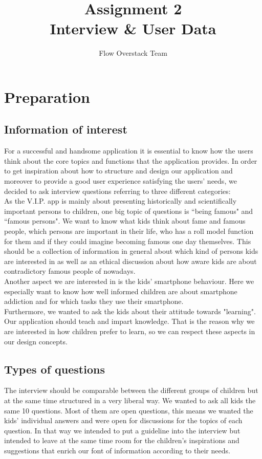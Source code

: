\documentclass[12pt]{scrartcl}
\title{Assignment 2\\ Interview \& User Data}
\author{Flow Overstack Team}
\date{}
\begin{document}
\maketitle


\section*{Preparation}
	\subsection*{Information of interest}
		For a successful and handsome application it is essential to know how the users think about the core topics and functions that the application provides. In order to get inspiration about how to structure and design our application and moreover to provide a good user experience satisfying the users' needs, we decided to ask interview questions referring to three different categories:\\
		
		As the V.I.P. app is mainly about presenting historically and scientifically important persons to children, one big topic of questions is ``being famous" and ``famous persons". We want to know what kids think about fame and famous people, which persons are important in their life, who has a roll model function for them and if they could imagine becoming famous one day themselves. This should be a collection of information in general about which kind of persons kids are interested in as well as an ethical discussion about how aware kids are about contradictory famous people of nowadays.\\
		
		Another aspect we are interested in is the kids' smartphone behaviour. Here we especially want to know how well informed children are about smartphone addiction and for which tasks they use their smartphone.\\
		
		Furthermore, we wanted to ask the kids about their attitude towards "learning". Our application should teach and impart knowledge. That is the reason why we are interested in how children prefer to learn, so we can respect these aspects in our design concepts.\\
		
	\subsection*{Types of questions}
		The interview should be comparable between the different groups of children but at the same time structured in a very liberal way. We wanted to ask all kids the same 10 questions. Most of them are open questions, this means we wanted the kids' individual answers and were open for discussions for the topics of each question. In that way we intended to put a guideline into the interview but intended to leave at the same time room for the children's inspirations and suggestions that enrich our font of information according to their needs.
\end{document}
